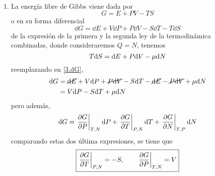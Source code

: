 \begin{sol}
\
\begin{enumerate}
\item 
La energía libre de Gibbs viene dada por
	\begin{equation}
  G= E+PV-TS
\end{equation}
o en su forma diferencial
\begin{equation}\label{3.dG}
  \dd G=\dd E+V\dd P+P\dd V-S\dd T-T\dd S
\end{equation}
de la expresión de la primera y la segunda ley de la termodinámica combinadas, donde consideraremos $Q=N$, tenemos
\begin{equation}
  T\dd S=\dd E+P\dd V-\mu\dd N
\end{equation}
reemplazando en \eqref{3.dG},
\begin{align}
  \dd G&=\cancel{\dd E}+V\dd P+\cancel{P\dd V}-S\dd T-\cancel{\dd E}-\cancel{P\dd V}+\mu\dd N\\
  &=V\dd P-S\dd T+\mu\dd N
\end{align}
pero además,
\begin{equation}
  \dd G=\eval{\pdv{G}{P}}_{T,N}\dd P+\eval{\pdv{G}{T}}_{P,N}\dd T+\eval{\pdv{G}{N}}_{T,P}\dd N
\end{equation}
comparando estas dos última expresiones, se tiene
que 
\begin{equation}\label{18-GTGP}
  \boxed{\eval{\pdv{G}{T}}_{P,N}=-S,\qquad \eval{\pdv{G}{P}}_{T,N}=V}
\end{equation}



\end{enumerate}
\end{sol}
